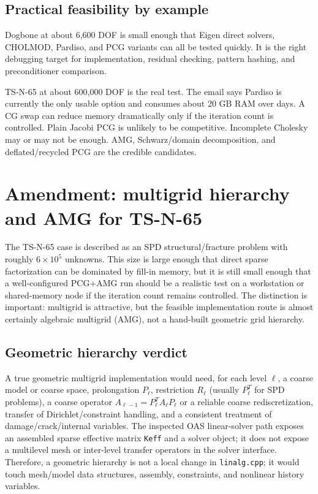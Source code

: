 \documentclass[10pt,a4paper]{article}
\newcommand{\code}[1]{\texttt{#1}}
\begin{document}
\subsection*{Practical feasibility by example}

Dogbone at about 6,600 DOF is small enough that Eigen direct solvers, CHOLMOD, Pardiso, and PCG variants can all be tested quickly. It is the right debugging target for implementation, residual checking, pattern hashing, and preconditioner comparison.

TS-N-65 at about 600,000 DOF is the real test. The email says Pardiso is currently the only usable option and consumes about 20 GB RAM over days. A CG swap can reduce memory dramatically only if the iteration count is controlled. Plain Jacobi PCG is unlikely to be competitive. Incomplete Cholesky may or may not be enough. AMG, Schwarz/domain decomposition, and deflated/recycled PCG are the credible candidates.


\section{Amendment: multigrid hierarchy and AMG for TS-N-65}

The TS-N-65 case is described as an SPD structural/fracture problem with roughly $6\times 10^5$ unknowns. This size is large enough that direct sparse factorization can be dominated by fill-in memory, but it is still small enough that a well-configured PCG+AMG run should be a realistic test on a workstation or shared-memory node if the iteration count remains controlled. The distinction is important: multigrid is attractive, but the feasible implementation route is almost certainly algebraic multigrid (AMG), not a hand-built geometric grid hierarchy.

\subsection*{Geometric hierarchy verdict}

A true geometric multigrid implementation would need, for each level $\ell$, a coarse model or coarse space, prolongation $P_\ell$, restriction $R_\ell$ (usually $P_\ell^T$ for SPD problems), a coarse operator $A_{\ell-1}=P_\ell^T A_\ell P_\ell$ or a reliable coarse rediscretization, transfer of Dirichlet/constraint handling, and a consistent treatment of damage/crack/internal variables. The inspected OAS linear-solver path exposes an assembled sparse effective matrix \code{Keff} and a solver object; it does not expose a multilevel mesh or inter-level transfer operators in the solver interface. Therefore, a geometric hierarchy is not a local change in \code{linalg.cpp}; it would touch mesh/model data structures, assembly, constraints, and nonlinear history variables.
\end{document}
